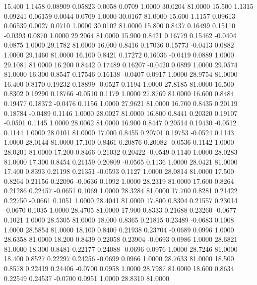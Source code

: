   15.400   1.1458   0.08909   0.05823   0.0058   0.0709   1.0000  30.0204  81.0000
  15.500   1.1315   0.09241   0.06159   0.0044   0.0709   1.0000  30.0167  81.0000
  15.600   1.1157   0.09613   0.06539   0.0027   0.0710   1.0000  30.0102  81.0000
  15.800   0.8437   0.16499   0.15110  -0.0393   0.0870   1.0000  29.2064  81.0000
  15.900   0.8421   0.16779   0.15462  -0.0404   0.0875   1.0000  29.1782  81.0000
  16.000   0.8416   0.17036   0.15773  -0.0413   0.0882   1.0000  29.1460  81.0000
  16.100   0.8421   0.17272   0.16036  -0.0419   0.0889   1.0000  29.1081  81.0000
  16.200   0.8442   0.17489   0.16207  -0.0420   0.0899   1.0000  29.0574  81.0000
  16.300   0.8547   0.17546   0.16138  -0.0407   0.0917   1.0000  28.9754  81.0000
  16.400   0.8170   0.19232   0.18899  -0.0527   0.1194   1.0000  27.8185  81.0000
  16.500   0.8302   0.19290   0.18766  -0.0510   0.1179   1.0000  27.8769  81.0000
  16.600   0.8484   0.19477   0.18372  -0.0476   0.1156   1.0000  27.9621  81.0000
  16.700   0.8435   0.20119   0.18784  -0.0489   0.1146   1.0000  28.0027  81.0000
  16.800   0.8441   0.20320   0.19107  -0.0501   0.1145   1.0000  28.0062  81.0000
  16.900   0.8447   0.20514   0.19430  -0.0512   0.1144   1.0000  28.0101  81.0000
  17.000   0.8455   0.20701   0.19753  -0.0524   0.1143   1.0000  28.0144  81.0000
  17.100   0.8461   0.20876   0.20082  -0.0536   0.1142   1.0000  28.0201  81.0000
  17.200   0.8466   0.21032   0.20422  -0.0549   0.1140   1.0000  28.0283  81.0000
  17.300   0.8454   0.21159   0.20809  -0.0565   0.1136   1.0000  28.0421  81.0000
  17.400   0.8393   0.21198   0.21351  -0.0593   0.1127   1.0000  28.0814  81.0000
  17.500   0.8264   0.21156   0.22096  -0.0636   0.1092   1.0000  28.2319  81.0000
  17.600   0.8264   0.21286   0.22457  -0.0651   0.1069   1.0000  28.3284  81.0000
  17.700   0.8281   0.21422   0.22750  -0.0661   0.1051   1.0000  28.4041  81.0000
  17.800   0.8304   0.21557   0.23014  -0.0670   0.1035   1.0000  28.4705  81.0000
  17.900   0.8333   0.21688   0.23260  -0.0677   0.1021   1.0000  28.5305  81.0000
  18.000   0.8365   0.21815   0.23489  -0.0683   0.1008   1.0000  28.5854  81.0000
  18.100   0.8400   0.21938   0.23704  -0.0689   0.0996   1.0000  28.6358  81.0000
  18.200   0.8439   0.22058   0.23904  -0.0693   0.0986   1.0000  28.6821  81.0000
  18.300   0.8481   0.22177   0.24088  -0.0696   0.0976   1.0000  28.7246  81.0000
  18.400   0.8527   0.22297   0.24256  -0.0699   0.0966   1.0000  28.7633  81.0000
  18.500   0.8578   0.22419   0.24406  -0.0700   0.0958   1.0000  28.7987  81.0000
  18.600   0.8634   0.22549   0.24537  -0.0700   0.0951   1.0000  28.8310  81.0000

